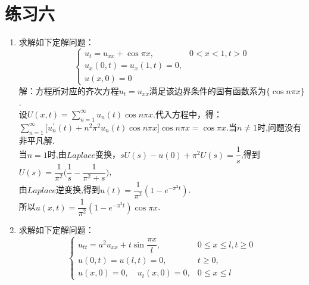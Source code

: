 \documentclass[11pt]{article}
\begin{document}
\section*{练习六}
    \begin{enumerate}
        \item 求解如下定解问题：
           \[
        \left\{
         \begin{array}{lr}
         u_t=u_{xx}+\cos\pi x, &0<x<1,t>0 \\
         u_x(0,t)=u_x(1,t)=0, \\
         u(x,0)=0
         \end{array}
        \right. \]
            解：方程所对应的齐次方程$u_t=u_{xx}$满足该边界条件的固有函数系为$\{\cos n\pi x\}$.\\设$U(x,t)=\sum\limits_{n=1}^{\infty}u_n(t)\cos n\pi x$.代入方程中，得：\\$\sum\limits_{n=1}^{\infty}\big[u^{'}_n(t)+n^2\pi^{2}u_{n}(t)\cos n\pi x\big]\cos n\pi x=\cos \pi x$.\quad 当$n\neq1$时,问题没有非平凡解.\\当$n=1$时,由$Laplace$变换，$sU(s)-u(0)+\pi^{2}U(s)=\dfrac{1}{s}$,得到$U(s)=\dfrac{1}{\pi^2}\big(\dfrac{1}{s}-\dfrac{1}{\pi^2+s}\big)$,\\由$Laplace$逆变换,得到$u(t)=\dfrac{1}{\pi^2}(1-e^{-\pi^{2}t})$.\\所以$u(x,t)=\dfrac{1}{\pi^2}(1-e^{-\pi^{2}t})\cos \pi x$.

        \item  求解如下定解问题：
        \[
        \left\{
         \begin{array}{lr}
         u_{tt}=a^2u_{xx}+t\sin\dfrac{\pi x}{l}, &0\leq x\leq l,t\geq 0 \\[6pt]
         u(0,t)=u(l,t)=0,&t\geq 0, \\
         u(x,0)=0,\quad u_t(x,0)=0,&0\leq x\leq l
         \end{array}
        \right. \]


\end{enumerate}
\end{document}
